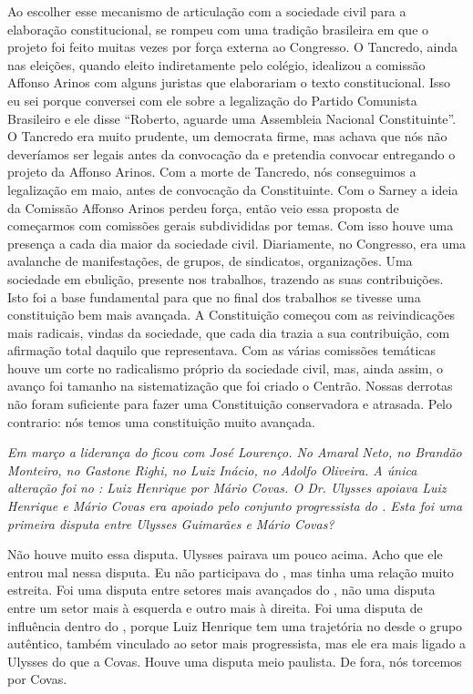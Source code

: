 Ao escolher esse mecanismo de articulação com a
sociedade civil para a elaboração constitucional, se rompeu com uma
tradição brasileira em que o projeto foi feito muitas vezes por força
externa ao Congresso. O Tancredo, ainda nas eleições, quando eleito
indiretamente pelo colégio, idealizou a comissão Affonso Arinos com
alguns juristas que elaborariam o texto constitucional. Isso eu sei
porque conversei com ele sobre a legalização do Partido Comunista
Brasileiro e ele disse ``Roberto, aguarde uma Assembleia Nacional
Constituinte''. O Tancredo era muito prudente, um democrata firme, mas
achava que nós não deveríamos ser legais antes da convocação da  e
pretendia convocar entregando o projeto da Affonso Arinos. Com a morte
de Tancredo, nós conseguimos a legalização em maio, antes de convocação
da Constituinte. Com o Sarney a ideia da Comissão Affonso Arinos perdeu
força, então veio essa proposta de começarmos com comissões gerais
subdivididas por temas. Com isso houve uma presença a cada dia maior da
sociedade civil. Diariamente, no Congresso, era uma avalanche de
manifestações, de grupos, de sindicatos, organizações. Uma sociedade em
ebulição, presente nos trabalhos, trazendo as suas contribuições. Isto
foi a base fundamental para que no final dos trabalhos se tivesse uma
constituição bem mais avançada. A Constituição começou com as
reivindicações mais radicais, vindas da sociedade, que cada dia trazia a
sua contribuição, com afirmação total daquilo que representava. Com as
várias comissões temáticas houve um corte no radicalismo próprio da
sociedade civil, mas, ainda assim, o avanço foi tamanho na
sistematização que foi criado o Centrão. Nossas derrotas não foram
suficiente para fazer uma Constituição conservadora e atrasada. Pelo
contrario: nós temos uma constituição muito avançada.

\medskip

\noindent\emph{Em março a liderança do  ficou com José Lourenço. No 
Amaral Neto, no  Brandão Monteiro, no  Gastone Righi, no  Luiz
Inácio, no  Adolfo Oliveira. A única alteração foi no : Luiz
Henrique por Mário Covas. O Dr. Ulysses apoiava Luiz Henrique e Mário
Covas era apoiado pelo conjunto progressista do . Esta foi uma
primeira disputa entre Ulysses Guimarães e Mário Covas?}

Não houve muito essa disputa. Ulysses pairava um pouco
acima. Acho que ele entrou mal nessa disputa. Eu não participava do
, mas tinha uma relação muito estreita. Foi uma disputa entre
setores mais avançados do , não uma disputa entre um setor mais à
esquerda e outro mais à direita. Foi uma disputa de influência dentro do
, porque Luiz Henrique tem uma trajetória no  desde o grupo
autêntico, também vinculado ao setor mais progressista, mas ele era mais
ligado a Ulysses do que a Covas. Houve uma disputa meio paulista. De
fora, nós torcemos por Covas.

